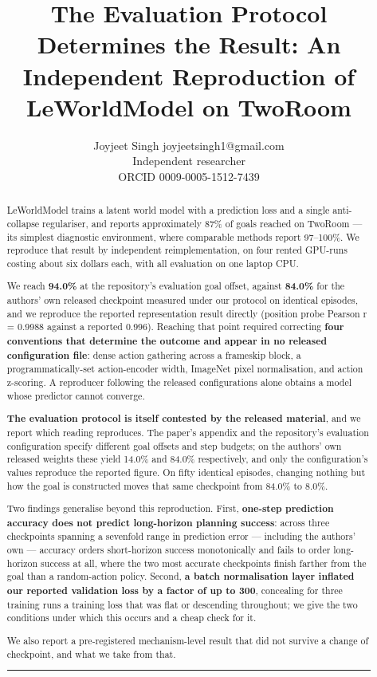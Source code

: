 \documentclass[10pt]{article}
\title{The Evaluation Protocol Determines the Result: An Independent Reproduction of LeWorldModel on TwoRoom}
\author{\name Joyjeet Singh \email joyjeetsingh1@gmail.com \\
      \addr Independent researcher \\ ORCID 0009-0005-1512-7439}
\begin{document}
\maketitle

\begin{abstract}
LeWorldModel trains a latent world model with a prediction loss and a single
anti-collapse regulariser, and reports approximately 87\% of goals reached on
TwoRoom --- its simplest diagnostic environment, where comparable methods report
97--100\%. We reproduce that result by independent reimplementation, on four
rented GPU-runs costing about six dollars each, with all evaluation on one
laptop CPU.

We reach \textbf{94.0\%} at the repository's evaluation goal offset, against \textbf{84.0\%}
for the authors' own released checkpoint measured under our protocol on
identical episodes, and we reproduce the reported representation result directly
(position probe Pearson r = 0.9988 against a reported 0.996). Reaching that
point required correcting \textbf{four conventions that determine the outcome and
appear in no released configuration file}: dense action gathering across a
frameskip block, a programmatically-set action-encoder width, ImageNet pixel
normalisation, and action z-scoring. A reproducer following the released
configurations alone obtains a model whose predictor cannot converge.

\textbf{The evaluation protocol is itself contested by the released material}, and we
report which reading reproduces. The paper's appendix and the repository's
evaluation configuration specify different goal offsets and step budgets; on the
authors' own released weights these yield 14.0\% and 84.0\% respectively, and only
the configuration's values reproduce the reported figure. On fifty identical
episodes, changing nothing but how the goal is constructed moves that same
checkpoint from 84.0\% to 8.0\%.

Two findings generalise beyond this reproduction. First, \textbf{one-step prediction
accuracy does not predict long-horizon planning success}: across three
checkpoints spanning a sevenfold range in prediction error --- including the
authors' own --- accuracy orders short-horizon success monotonically and fails to
order long-horizon success at all, where the two most accurate checkpoints
finish farther from the goal than a random-action policy. Second, \textbf{a batch
normalisation layer inflated our reported validation loss by a factor of up to 300}, concealing for three training runs a training loss that was flat
or descending throughout; we give the two conditions under which this occurs and
a cheap check for it.

We also report a pre-registered mechanism-level result that did not survive a
change of checkpoint, and what we take from that.

\begin{center}\rule{0.5\linewidth}{0.5pt}\end{center}
\end{abstract}
\end{document}
